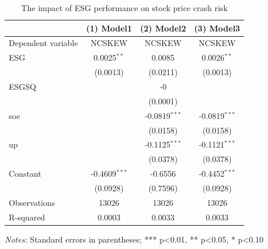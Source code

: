 \begin{table}[htbp]
\centering
\begin{threeparttable}
\caption{The impact of ESG performance on stock price crash risk}
\begin{tabular}{@{}lccc@{}}
\toprule
 & (1) Model1 & (2) Model2 & (3) Model3  \\
\midrule
Dependent variable & NCSKEW & NCSKEW & NCSKEW  \\
\midrule
ESG  & 0.0025$^{**}$ & 0.0085 & 0.0026$^{**}$ \\
 & (0.0013) & (0.0211) & (0.0013) \\
ESGSQ  &   & -0 &   \\
 &   & (0.0001) &   \\
soe  &   & -0.0819$^{***}$ & -0.0819$^{***}$ \\
 &   & (0.0158) & (0.0158) \\
up  &   & -0.1125$^{***}$ & -0.1121$^{***}$ \\
 &   & (0.0378) & (0.0378) \\
Constant  & -0.4609$^{***}$ & -0.6556 & -0.4452$^{***}$ \\
 & (0.0928) & (0.7596) & (0.0928) \\
\midrule
Observations & 13026 & 13026 & 13026 \\
R-squared & 0.0003 & 0.0033 & 0.0033 \\
\bottomrule
\end{tabular}
\begin{tablenotes}
\small
\item \textit{Notes:} Standard errors in parentheses; *** p<0.01, ** p<0.05, * p<0.10
\end{tablenotes}
\end{threeparttable}
\end{table}